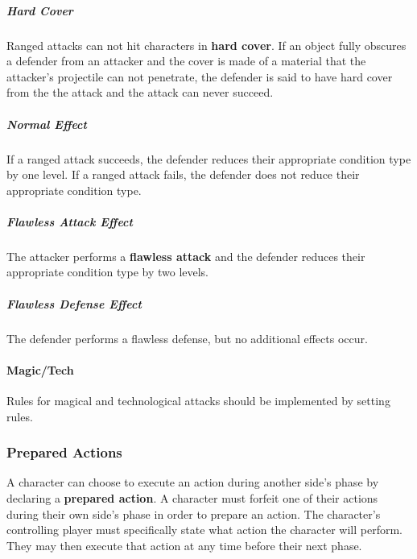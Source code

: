 \documentclass[11pt]{article}
\begin{document}
\subparagraph{Hard Cover}
Ranged attacks can not hit characters in \textbf{hard cover}.
If an object fully obscures a defender from an attacker and the cover is made of a material that the attacker's projectile can not penetrate, the defender is said to have hard cover from the the attack and the attack can never succeed.

\subparagraph{Normal Effect}
If a ranged attack succeeds, the defender reduces their appropriate condition type by one level.
If a ranged attack fails, the defender does not reduce their appropriate condition type.

\subparagraph{Flawless Attack Effect}
The attacker performs a \textbf{flawless attack} and the defender reduces their appropriate condition type by two levels.

\subparagraph{Flawless Defense Effect}
The defender performs a flawless defense, but no additional effects occur.

\paragraph{Magic/Tech}
Rules for magical and technological attacks should be implemented by setting rules.

\subsubsection{Prepared Actions}
A character can choose to execute an action during another side's phase by declaring a \textbf{prepared action}.
A character must forfeit one of their actions during their own side's phase in order to prepare an action.
The character's controlling player must specifically state what action the character will perform.
They may then execute that action at any time before their next phase.
\end{document}

